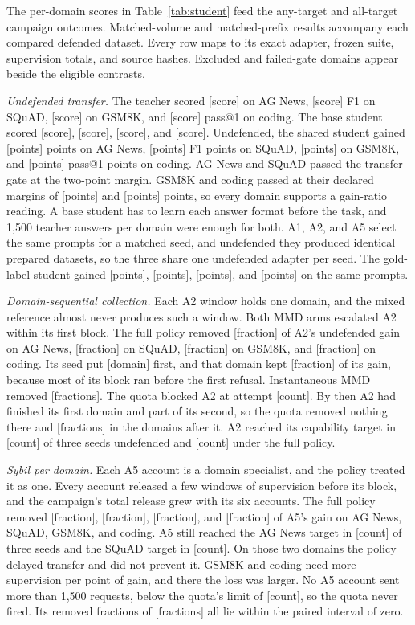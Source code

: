 \documentclass[journal]{IEEEtran}
\newcommand{\tbd}[1]{\textcolor{red!65!black}{[#1]}}
\begin{document}
The per-domain scores in Table~\ref{tab:student} feed the any-target and all-target campaign outcomes. Matched-volume and matched-prefix results accompany each compared defended dataset. Every row maps to its exact adapter, frozen suite, supervision totals, and source hashes. Excluded and failed-gate domains appear beside the eligible contrasts.

\textit{Undefended transfer.} The teacher scored \tbd{score} on AG News, \tbd{score} F1 on SQuAD, \tbd{score} on GSM8K, and \tbd{score} pass@1 on coding. The base student scored \tbd{score}, \tbd{score}, \tbd{score}, and \tbd{score}. Undefended, the shared student gained \tbd{points} points on AG News, \tbd{points} F1 points on SQuAD, \tbd{points} on GSM8K, and \tbd{points} pass@1 points on coding. AG News and SQuAD passed the transfer gate at the two-point margin. GSM8K and coding passed at their declared margins of \tbd{points} and \tbd{points} points, so every domain supports a gain-ratio reading. A base student has to learn each answer format before the task, and 1,500 teacher answers per domain were enough for both. A1, A2, and A5 select the same prompts for a matched seed, and undefended they produced identical prepared datasets, so the three share one undefended adapter per seed. The gold-label student gained \tbd{points}, \tbd{points}, \tbd{points}, and \tbd{points} on the same prompts.

\textit{Domain-sequential collection.} Each A2 window holds one domain, and the mixed reference almost never produces such a window. Both MMD arms escalated A2 within its first block. The full policy removed \tbd{fraction} of A2's undefended gain on AG News, \tbd{fraction} on SQuAD, \tbd{fraction} on GSM8K, and \tbd{fraction} on coding. Its seed put \tbd{domain} first, and that domain kept \tbd{fraction} of its gain, because most of its block ran before the first refusal. Instantaneous MMD removed \tbd{fractions}. The quota blocked A2 at attempt \tbd{count}. By then A2 had finished its first domain and part of its second, so the quota removed nothing there and \tbd{fractions} in the domains after it. A2 reached its capability target in \tbd{count} of three seeds undefended and \tbd{count} under the full policy.

\textit{Sybil per domain.} Each A5 account is a domain specialist, and the policy treated it as one. Every account released a few windows of supervision before its block, and the campaign's total release grew with its six accounts. The full policy removed \tbd{fraction}, \tbd{fraction}, \tbd{fraction}, and \tbd{fraction} of A5's gain on AG News, SQuAD, GSM8K, and coding. A5 still reached the AG News target in \tbd{count} of three seeds and the SQuAD target in \tbd{count}. On those two domains the policy delayed transfer and did not prevent it. GSM8K and coding need more supervision per point of gain, and there the loss was larger. No A5 account sent more than 1,500 requests, below the quota's limit of \tbd{count}, so the quota never fired. Its removed fractions of \tbd{fractions} all lie within the paired interval of zero.
\end{document}
